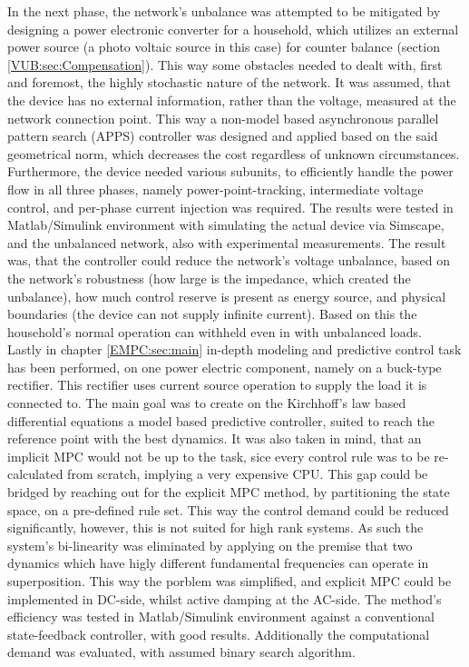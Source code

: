 In the next phase, the network's unbalance was attempted to be mitigated by designing a power electronic converter for a household, which utilizes an external power source (a photo voltaic source in this case) for counter balance (section \ref{VUB:sec:Compensation}). This way some obstacles needed to dealt with, first and foremost, the highly stochastic nature of the network. It was assumed, that the device has no external information, rather than the voltage, measured at the network connection point. This way a non-model based asynchronous parallel pattern search (APPS) controller was designed and applied based on the said geometrical norm, which decreases the cost regardless of unknown circumstances. Furthermore, the device needed various subunits, to efficiently handle the power flow in all three phases, namely power-point-tracking, intermediate voltage control, and per-phase current injection was required. The results were tested in Matlab/Simulink environment with simulating the actual device via Simscape, and the unbalanced network, also with experimental measurements. The result was, that the controller could reduce the network's voltage unbalance, based on the network's robustness (how large is the impedance, which created the unbalance), how much control reserve is present as energy source, and physical boundaries (the device can not supply infinite current). Based on this the household's normal operation can withheld even in with unbalanced loads.\\
Lastly in chapter \ref{EMPC:sec:main} in-depth modeling and predictive control task has been performed, on one power electric component, namely on a buck-type rectifier. This rectifier uses current source operation to supply the load it is connected to. The main goal was to create on the Kirchhoff's law based differential equations a model based predictive controller, suited to reach the reference point with the best dynamics. It was also taken in mind, that an implicit MPC would not be up to the task, sice every control rule was to be re-calculated from scratch, implying a very expensive CPU. This gap could be bridged by reaching out for the explicit MPC method, by partitioning the state space, on a pre-defined rule set. This way the control demand could be reduced significantly, however, this is not suited for high rank systems. As such the system's bi-linearity was eliminated by applying on the premise that two dynamics which have higly different fundamental frequencies can operate in superposition. This way the porblem was simplified, and explicit MPC could be implemented in DC-side, whilst active damping at the AC-side. The method's efficiency was tested in Matlab/Simulink environment against a conventional state-feedback controller, with good results. Additionally the computational demand was evaluated, with assumed binary search algorithm.\\

